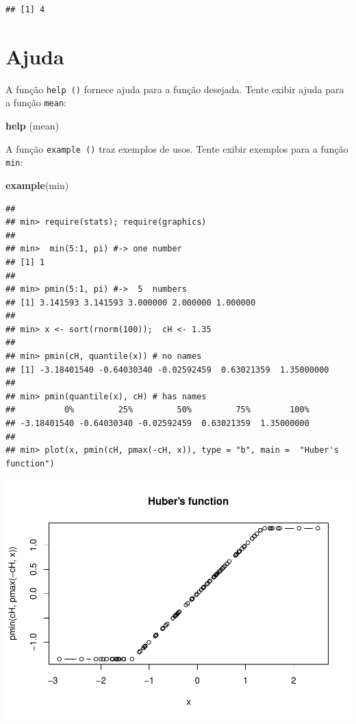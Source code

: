 \documentclass[
]{book}
\newenvironment{Shaded}{\begin{snugshade}}{\end{snugshade}}
\newcommand{\KeywordTok}[1]{\textcolor[rgb]{0.13,0.29,0.53}{\textbf{#1}}}
\newcommand{\NormalTok}[1]{#1}
\begin{document}
\begin{verbatim}
## [1] 4
\end{verbatim}

\hypertarget{ajuda}{%
\section{Ajuda}\label{ajuda}}

A função \texttt{help\ ()} fornece ajuda para a função desejada. Tente exibir ajuda para a função \texttt{mean}:

\begin{Shaded}
\begin{Highlighting}[]
\KeywordTok{help}\NormalTok{ (mean)}
\end{Highlighting}
\end{Shaded}

A função \texttt{example\ ()} traz exemplos de usos. Tente exibir exemplos para a função \texttt{min}:

\begin{Shaded}
\begin{Highlighting}[]
\KeywordTok{example}\NormalTok{(min)}
\end{Highlighting}
\end{Shaded}

\begin{verbatim}
## 
## min> require(stats); require(graphics)
## 
## min>  min(5:1, pi) #-> one number
## [1] 1
## 
## min> pmin(5:1, pi) #->  5  numbers
## [1] 3.141593 3.141593 3.000000 2.000000 1.000000
## 
## min> x <- sort(rnorm(100));  cH <- 1.35
## 
## min> pmin(cH, quantile(x)) # no names
## [1] -3.18401540 -0.64030340 -0.02592459  0.63021359  1.35000000
## 
## min> pmin(quantile(x), cH) # has names
##          0%         25%         50%         75%        100% 
## -3.18401540 -0.64030340 -0.02592459  0.63021359  1.35000000 
## 
## min> plot(x, pmin(cH, pmax(-cH, x)), type = "b", main =  "Huber's function")
\end{verbatim}

\includegraphics{TudodoR_files/figure-latex/unnamed-chunk-14-1.pdf}
\end{document}
